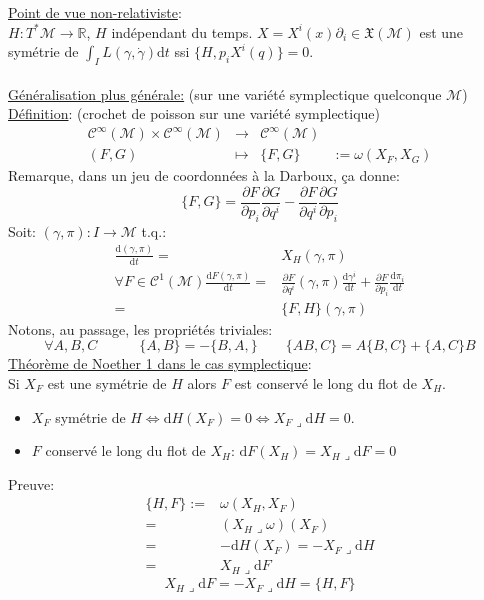 \documentclass[a4paper,11pt]{article}
\renewcommand{\d}{{\mathrm{d}}}
\newcommand{\dr}[2]{\frac{\partial {#1}}{\partial{#2}}}
\begin{document}
\noindent \underline{Point de vue non-relativiste}:\\
$H:T^*\mathcal{M}\to \mathbb{R}$, $H$ indépendant du temps. $X=X^i(x)\partial_i \in \mathfrak{X}(\mathcal{M})$ est une symétrie de $\int_I L(\gamma,\dot\gamma)\d t$ ssi $\{H, p_i X^i(q)\}=0$.\\\\
\underline{Généralisation plus générale:} (sur une variété symplectique quelconque $\mathcal{M}$)\\
\underline{Définition}: (crochet de poisson sur une variété symplectique)\\
$$\begin{matrix}
\mathcal{C}^\infty(\mathcal{M})\times\mathcal{C}^\infty(\mathcal{M}) &
\to & \mathcal{C}^\infty(\mathcal{M})&\\
(F,G) & \mapsto & \{F,G\}&
:= \omega(X_F,X_G)
\end{matrix}$$
Remarque, dans un jeu de coordonnées à la Darboux, ça donne:
$$\{F,G\} = \dr F{p_i}\dr G{q^i} - \dr F{q^i}\dr G{p_i}$$
Soit: $(\gamma,\pi): I \to \mathcal{M}$ t.q.:
\begin{align*}
\frac{\d (\gamma,\pi)}{\d t} =& X_H(\gamma,\pi)\\
\forall F \in\mathcal{C}^1(\mathcal{M}) \frac{\d F(\gamma,\pi)}{\d t} =&
\dr F{q^i}(\gamma,\pi)\frac{\d \gamma^i}{\d t} + \dr F{p_i}\frac{\d \pi_i}{\d t}\\
=& \{F,H\}(\gamma,\pi)
\end{align*}
Notons, au passage, les propriétés triviales:
$$\forall A,B,C \quad \quad \quad \{A,B\}=-\{B,A,\} \quad \quad \{AB,C\}=A\{B,C\}+\{A,C\}B$$
\underline{Théorème de Noether 1 dans le cas symplectique}:\\
Si $X_F$ est une symétrie de $H$ alors $F$ est conservé le long du flot de $X_H$.
\begin{itemize}
\item $X_F$ symétrie de $H \iff \d H(X_F)=0 \iff X_F\lrcorner\d H = 0$.
\item $F$ conservé le long du flot de $X_H$: $\d F(X_H) = X_H\lrcorner\d F = 0$
\end{itemize}
Preuve:
\begin{align*}
\{H,F\} :=& \omega(X_H, X_F)\\
=& (X_H\lrcorner \omega)(X_F)\\
=& -\d H(X_F) = - X_F \lrcorner \d H\\
=& X_H \lrcorner \d F
\end{align*}
$$\boxed{X_H\lrcorner \d F = - X_F \lrcorner\d H =\{H,F\}}$$
\end{document}
